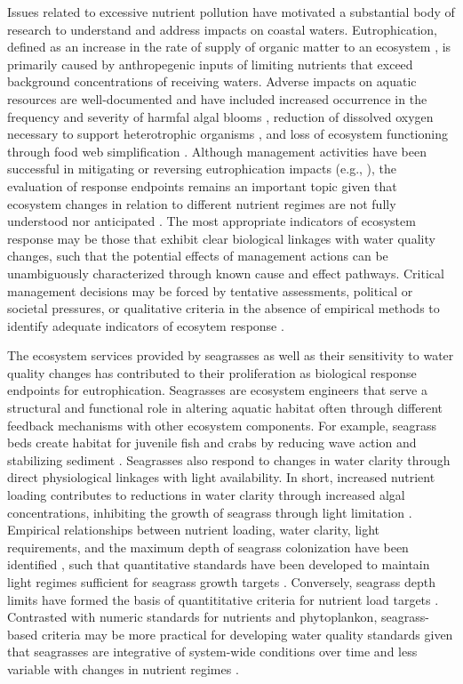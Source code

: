 \documentclass[letterpaper,12pt,oneside]{article}\usepackage[]{graphicx}\usepackage[]{color}
\begin{document}
Issues related to excessive nutrient pollution have motivated a substantial body of research to understand and address impacts on coastal waters.  Eutrophication, defined as an increase in the rate of supply of organic matter to an ecosystem \citep{Nixon95}, is primarily caused by anthropegenic inputs of limiting nutrients that exceed background concentrations of receiving waters.  Adverse impacts on aquatic resources are well-documented and have included increased occurrence in the frequency and severity of harmfal algal blooms \citep{Cloern96}, reduction of dissolved oxygen necessary to support heterotrophic organisms \citep{Justic87,Diaz08}, and loss of ecosystem functioning through food web simplification \citep{Tewfik07}. Although management activities have been successful in mitigating or reversing eutrophication impacts (e.g., \citealt{Greening06}), the evaluation of response endpoints remains an important topic given that ecosystem changes in relation to different nutrient regimes are not fully understood nor anticipated \citep{Duarte09}.  The most appropriate indicators of ecosystem response may be those that exhibit clear biological linkages with water quality changes, such that the potential effects of management actions can be unambiguously characterized through known cause and effect pathways.  Critical management decisions may be forced by tentative assessments, political or societal pressures, or qualitative criteria in the absence of empirical methods to identify adequate indicators of ecosytem response \citep{Duarte09}.  

The ecosystem services provided by seagrasses as well as their sensitivity to water quality changes has contributed to their proliferation as biological response endpoints for eutrophication.  Seagrasses are ecosystem engineers \citep{Jones94,Koch01} that serve a structural and functional role in altering aquatic habitat often through different feedback mechanisms with other ecosystem components.  For example, seagrass beds create habitat for juvenile fish and crabs by reducing wave action and stabilizing sediment \citep{williams01,Hughes09}.  Seagrasses also respond to changes in water clarity through direct physiological linkages with light availability.  In short, increased nutrient loading contributes to reductions in water clarity through increased algal concentrations, inhibiting the growth of seagrass through light limitation \citep{Duarte95}.  Empirical relationships between nutrient loading, water clarity, light requirements, and the maximum depth of seagrass colonization have been identified \citep{Duarte91,Kenworthy96,Choice14}, such that quantitative standards have been developed to maintain light regimes sufficient for seagrass growth targets \citep{Steward05}.  Conversely, seagrass depth limits have formed the basis of quantititative criteria for nutrient load targets \citep{Janicki96}.  Contrasted with numeric standards for nutrients and phytoplankon, seagrass-based criteria may be more practical for developing water quality standards given that seagrasses are integrative of system-wide conditions over time and less variable with changes in nutrient regimes \citep{Duarte95}.  
\end{document}
